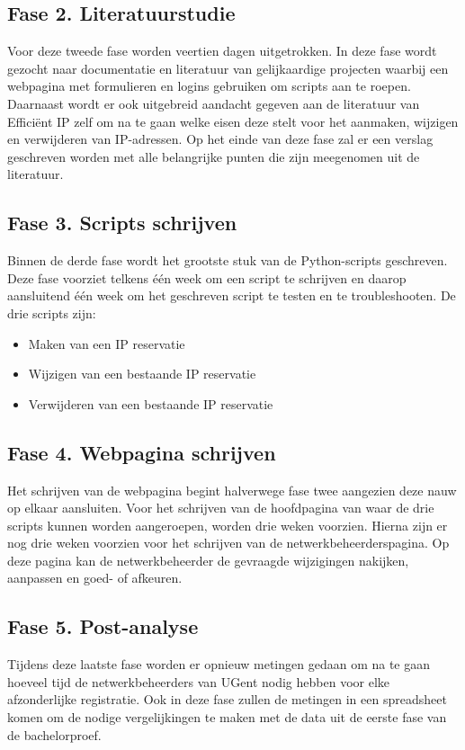 \documentclass{hogent-article}
\begin{document}
\subsection{Fase 2. Literatuurstudie}
Voor deze tweede fase worden veertien dagen uitgetrokken. In deze fase wordt gezocht naar documentatie en literatuur van gelijkaardige projecten waarbij een webpagina met formulieren en logins gebruiken om scripts aan te roepen. Daarnaast wordt er ook uitgebreid aandacht gegeven aan de literatuur van Efficiënt IP zelf om na te gaan welke eisen deze stelt voor het aanmaken, wijzigen en verwijderen van IP-adressen.
Op het einde van deze fase zal er een verslag geschreven worden met alle belangrijke punten die zijn meegenomen uit de literatuur.

\subsection{Fase 3. Scripts schrijven}
Binnen de derde fase wordt het grootste stuk van de Python-scripts geschreven. Deze fase voorziet telkens één week om een script te schrijven en daarop aansluitend één week om het geschreven script te testen en te troubleshooten. De drie scripts zijn:
\begin{itemize}
    \item Maken van een IP reservatie
    \item Wijzigen van een bestaande IP reservatie
    \item Verwijderen van een bestaande IP reservatie
\end{itemize}

\subsection{Fase 4. Webpagina schrijven}
Het schrijven van de webpagina begint halverwege fase twee aangezien deze nauw op elkaar aansluiten.
Voor het schrijven van de hoofdpagina van waar de drie scripts kunnen worden aangeroepen, worden drie weken voorzien. Hierna zijn er nog drie weken voorzien voor het schrijven van de netwerkbeheerderspagina. Op deze pagina kan de netwerkbeheerder de gevraagde wijzigingen nakijken, aanpassen en goed- of afkeuren. 

\subsection{Fase 5. Post-analyse}
Tijdens deze laatste fase worden er opnieuw metingen gedaan om na te gaan hoeveel tijd de netwerkbeheerders van UGent nodig hebben voor elke afzonderlijke registratie. Ook in deze fase zullen de metingen in een spreadsheet komen om de nodige vergelijkingen te maken met de data uit de eerste fase van de bachelorproef.
\end{document}

